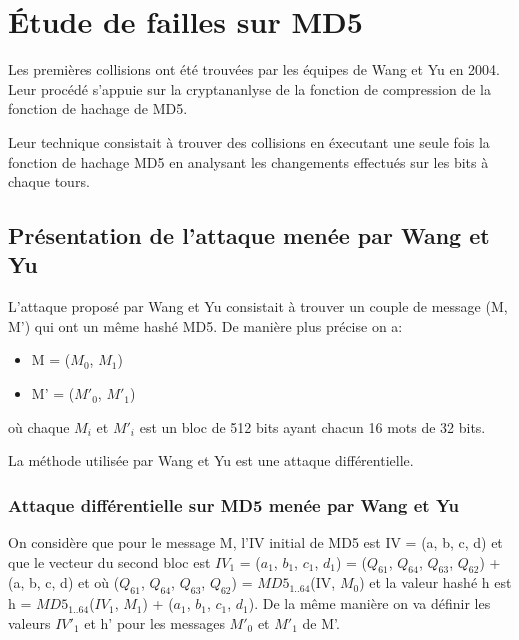 \documentclass[a4paper,11pt,french]{article}
\begin{document}
\section{Étude de failles sur MD5}

Les premières collisions ont été trouvées par les équipes de Wang et Yu en 2004. Leur procédé s'appuie sur la cryptananlyse de la fonction de compression de la fonction de hachage de MD5. 

Leur technique consistait à trouver des collisions en éxecutant une seule fois la fonction de hachage MD5 en analysant les changements effectués sur les bits à chaque tours.

\subsection{Présentation de l'attaque menée par Wang et Yu}
L'attaque proposé par Wang et Yu consistait à trouver un couple de message (M, M') qui ont un même hashé MD5. De manière plus précise on a:
\begin{itemize}
  \item M = ($M_{0}$, $M_{1}$)
  \item M' = ($M'_{0}$, $M'_{1}$)
\end{itemize}
où chaque $M_{i}$ et $M'_{i}$ est un bloc de 512 bits ayant chacun 16 mots de 32 bits.

La méthode utilisée par Wang et Yu est une attaque différentielle.





\subsubsection{Attaque différentielle sur MD5 menée par Wang et Yu}
On considère que pour le message M, l'IV initial de MD5 est IV = (a, b, c, d) et que le vecteur du second bloc est $IV_{1}$ = ($a_{1}$, $b_{1}$, $c_{1}$, $d_{1}$) = ($Q_{61}$, $Q_{64}$, $Q_{63}$, $Q_{62}$) + (a, b, c, d) et où ($Q_{61}$, $Q_{64}$, $Q_{63}$, $Q_{62}$) = $MD5_{1..64}$(IV, $M_{0}$) et la valeur hashé h est h = $MD5_{1..64}$($IV_{1}$, $M_{1}$) + ($a_{1}$, $b_{1}$, $c_{1}$, $d_{1}$). De la même manière on va définir les valeurs $IV'_{1}$ et h' pour les messages $M'_{0}$ et $M'_{1}$ de M'.\\
\end{document}
